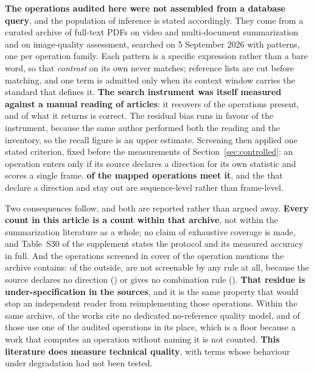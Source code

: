 \textbf{The operations audited here were not assembled from a
database query}, and the population of inference is stated accordingly. They come from a curated archive of
\acvPdfs{} full-text PDFs on video and multi-document summarization and on image-quality
assessment, searched on 5 September 2026 with \acvTermos{} patterns, one per operation
family. Each pattern is a specific expression rather than a bare word, so that
\emph{contrast} on its own never matches; reference lists are cut before matching, and one
term is admitted only when its context window carries the standard that defines it.
\textbf{The search instrument was itself measured against a manual reading of \varrN{}
articles}: it recovers \varrCob{} of the operations present, and \varrPrec{} of what it
returns is correct. The residual bias runs in favour of the instrument, because the same
author performed both the reading and the inventory, so the recall figure is an upper
estimate. Screening then applied one stated criterion, fixed before the measurements of
Section~\ref{sec:controlled}: an operation enters only if its source declares a direction
for its own statistic and scores a single frame. \textbf{\triTriadas{} of the \triMapa{}
mapped operations meet it}, and the \triForaComDirecao{} that declare a direction and stay
out are sequence-level rather than frame-level.

Two consequences follow, and both are reported rather than argued away. \textbf{Every count
in this article is a count within that archive}, not within the summarization literature as
a whole; no claim of exhaustive coverage is made, and Table~S30 of the supplement states
the protocol and its measured accuracy in full. And the operations screened in cover
\cobMencoes{} of the \cobTotal{} operation mentions the archive contains: of the
\cobFora{} outside, \cobNaoTriavel{} are not screenable by any rule at all, because the
source declares no direction (\cobSemDirecao{}) or gives no combination rule
(\cobSemRegra{}). \textbf{That residue is under-specification in the sources}, and it
is the same property that would stop an independent reader from reimplementing those
operations. Within the same archive, \acvSemDedicado{} of the \acvPdfs{} works cite no
dedicated no-reference quality model, and \acvUsamOperacao{} of those use one of the
audited operations in its place, which is a floor because a work that computes an
operation without naming it is not counted. \textbf{This literature does measure technical quality}, with terms
whose behaviour under degradation had not been tested.

